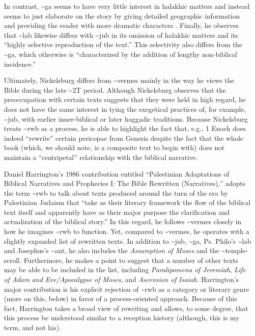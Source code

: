 In contrast, \textasciitilde{}ga seems to have very little interest in
halakhic matters and instead seems to just elaborate on the story by
giving detailed geographic information and providing the reader with
more dramatic characters \autocite[106]{nickelsburg_stone1984}. Finally,
he observes that \textasciitilde{}lab likewise differs with
\textasciitilde{}jub in its omission of halakhic matters and its
``highly selective reproduction of the
text.''\autocite[110]{nickelsburg_stone1984} This selectivity also
differs from the \textasciitilde{}ga, which otherwise is ``characterized
by the addition of lengthy non-biblical
incidence.''\autocite[110]{nickelsburg_stone1984}

Ultimately, Nickelsburg differs from \textasciitilde{}vermes mainly in
the way he views the Bible during the late \textasciitilde{}2T period.
Although Nickelsburg observes that the preoccupation with certain texts
suggests that they were held in high regard, he does not have the same
interest in tying the exegetical practices of, for example,
\textasciitilde{}jub, with earlier inner-biblical or later haggadic
traditions. Because Nickelsburg treats \textasciitilde{}rwb as a
process, he is able to highlight the fact that, e.g., 1 Enoch does
indeed ``rewrite'' certain pericopae from Genesis despite the fact that
the whole book (which, we should note, is a composite text to begin
with) does not maintain a ``centripetal'' relationship with the biblical
narrative.

Daniel Harrington's 1986 contribution entitled ``Palestinian Adaptations
of Biblical Narratives and Prophecies I: The Bible Rewritten
(Narratives),'' adopts the term \textasciitilde{}rwb to talk about texts
produced around the turn of the era by Palestinian Judaism that ``take
as their literary framework the flow of the biblical text itself and
apparently have as their major purpose the clarification and
actualization of the biblical
story.''\autocite[239]{harrington_kraft-nickelsburg1986} In this regard,
he follows \textasciitilde{}vermes closely in how he imagines
\textasciitilde{}rwb to function. Yet, compared to
\textasciitilde{}vermes, he operates with a slightly expanded list of
rewritten texts. In addition to \textasciitilde{}jub,
\textasciitilde{}ga, Ps. Philo's \textasciitilde{}lab and Josephus's
\textasciitilde{}ant, he also includes the \emph{Assumption of Moses}
and the \textasciitilde{}temple-scroll. Furthermore, he makes a point to
suggest that a number of other texts may be able to be included in the
list, including \emph{Paralipomena of Jeremiah}, \emph{Life of Adam and
Eve/Apocalypse of Moses}, and \emph{Ascension of Isaiah}. Harrington's
major contribution is his explicit rejection of \textasciitilde{}rwb as
a category or literary genre (more on this, below) in favor of a
process-oriented approach. Because of this fact, Harrington takes a
broad view of rewriting and allows, to some degree, that this process be
understood similar to a reception history (although, this is my term,
and not his).

